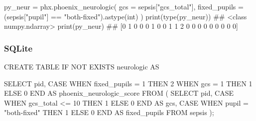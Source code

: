 \documentclass[
  letterpaper,
  DIV=11,
  numbers=noendperiod]{scrartcl}
\newenvironment{Shaded}{\begin{snugshade}}{\end{snugshade}}
\newcommand{\BuiltInTok}[1]{\textcolor[rgb]{0.00,0.23,0.31}{#1}}
\newcommand{\CommentTok}[1]{\textcolor[rgb]{0.37,0.37,0.37}{#1}}
\newcommand{\ControlFlowTok}[1]{\textcolor[rgb]{0.00,0.23,0.31}{#1}}
\newcommand{\DecValTok}[1]{\textcolor[rgb]{0.68,0.00,0.00}{#1}}
\newcommand{\KeywordTok}[1]{\textcolor[rgb]{0.00,0.23,0.31}{#1}}
\newcommand{\NormalTok}[1]{\textcolor[rgb]{0.00,0.23,0.31}{#1}}
\newcommand{\OperatorTok}[1]{\textcolor[rgb]{0.37,0.37,0.37}{#1}}
\newcommand{\OtherTok}[1]{\textcolor[rgb]{0.00,0.23,0.31}{#1}}
\newcommand{\StringTok}[1]{\textcolor[rgb]{0.13,0.47,0.30}{#1}}
\begin{document}
\begin{Shaded}
\begin{Highlighting}[]
\NormalTok{py\_neur }\OperatorTok{=}\NormalTok{ phx.phoenix\_neurologic(}
\NormalTok{    gcs }\OperatorTok{=}\NormalTok{ sepsis[}\StringTok{"gcs\_total"}\NormalTok{],}
\NormalTok{    fixed\_pupils }\OperatorTok{=}\NormalTok{ (sepsis[}\StringTok{"pupil"}\NormalTok{] }\OperatorTok{==} \StringTok{"both{-}fixed"}\NormalTok{).astype(}\BuiltInTok{int}\NormalTok{)}
\NormalTok{)}
\BuiltInTok{print}\NormalTok{(}\BuiltInTok{type}\NormalTok{(py\_neur))}
\CommentTok{\#\# \textless{}class \textquotesingle{}numpy.ndarray\textquotesingle{}\textgreater{}}
\BuiltInTok{print}\NormalTok{(py\_neur)}
\CommentTok{\#\# [0 1 0 0 0 1 0 0 1 1 2 0 0 0 0 0 0 0 0 0]}
\end{Highlighting}
\end{Shaded}

\subsubsection{SQLite}\label{sqlite-3}

\begin{Shaded}
\begin{Highlighting}[]
\KeywordTok{CREATE} \KeywordTok{TABLE} \ControlFlowTok{IF} \KeywordTok{NOT} \KeywordTok{EXISTS}\NormalTok{ neurologic }\KeywordTok{AS}

\KeywordTok{SELECT}
\NormalTok{  pid,}
  \ControlFlowTok{CASE} \ControlFlowTok{WHEN}\NormalTok{ fixed\_pupils }\OperatorTok{=} \DecValTok{1} \ControlFlowTok{THEN} \DecValTok{2}
       \ControlFlowTok{WHEN}\NormalTok{ gcs }\OperatorTok{=} \DecValTok{1}          \ControlFlowTok{THEN} \DecValTok{1}
       \ControlFlowTok{ELSE} \DecValTok{0} \ControlFlowTok{END} \KeywordTok{AS}\NormalTok{ phoenix\_neurologic\_score}
\KeywordTok{FROM}\NormalTok{ (}
  \KeywordTok{SELECT}
\NormalTok{    pid,}
    \ControlFlowTok{CASE} \ControlFlowTok{WHEN}\NormalTok{ gcs\_total }\OperatorTok{\textless{}=} \DecValTok{10} \ControlFlowTok{THEN} \DecValTok{1} \ControlFlowTok{ELSE} \DecValTok{0} \ControlFlowTok{END} \KeywordTok{AS}\NormalTok{ gcs,}
    \ControlFlowTok{CASE} \ControlFlowTok{WHEN}\NormalTok{ pupil }\OperatorTok{=} \OtherTok{"both{-}fixed"} \ControlFlowTok{THEN} \DecValTok{1} \ControlFlowTok{ELSE} \DecValTok{0} \ControlFlowTok{END} \KeywordTok{AS}\NormalTok{ fixed\_pupils}
  \KeywordTok{FROM}\NormalTok{ sepsis}
\NormalTok{);}
\end{Highlighting}
\end{Shaded}
\end{document}
